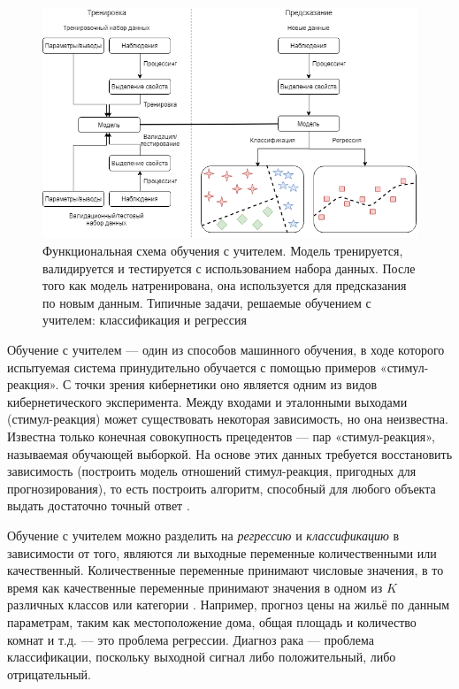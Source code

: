 \begin{figure}[ht!]
    \center
    \includegraphics [scale=0.60] {my_folder/images/ch1/supervised-learning.png}
    \caption{Функциональная схема обучения с учителем. Модель тренируется, валидируется и тестируется с использованием набора данных. После того как модель натренирована, она используется для предсказания по новым данным. Типичные задачи, решаемые обучением с учителем: классификация и регрессия}
    \label{fig:supervised-learning}
\end{figure}

Обучение с учителем --- один из способов машинного обучения, в ходе которого испытуемая система принудительно обучается с помощью примеров «стимул-реакция». С точки зрения кибернетики оно является одним из видов кибернетического эксперимента. Между входами и эталонными выходами (стимул-реакция) может существовать некоторая зависимость, но она неизвестна. Известна только конечная совокупность прецедентов — пар «стимул-реакция», называемая обучающей выборкой. На основе этих данных требуется восстановить зависимость (построить модель отношений стимул-реакция, пригодных для прогнозирования), то есть построить алгоритм, способный для любого объекта выдать достаточно точный ответ \cite{james2014introduction}.

Обучение с учителем можно разделить на \textit{регрессию} и \textit{классификацию} в зависимости от того, являются ли выходные переменные количественными или качественный. Количественные переменные принимают числовые значения, в то время как качественные переменные принимают значения в одном из $K$ различных классов или категории \cite{james2014introduction}. Например, прогноз цены на жильё по данным параметрам, таким как местоположение дома, общая площадь и количество комнат и т.д. --- это проблема регрессии. Диагноз рака --- проблема классификации, поскольку выходной сигнал либо положительный, либо отрицательный.

